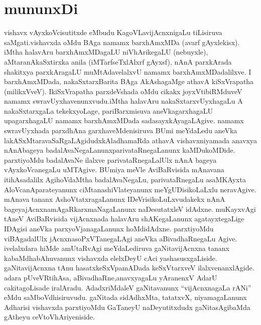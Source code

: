 {
\makeatletter
\def\@makechapterhead#1{%
  \vspace*{5\p@}%
  {\parindent \z@ \raggedright \normalfont
    \ifnum \c@secnumdepth >\m@ne
      \if@mainmatter
        \LARGE\bfseries \@chapapp\space\thechapter
        \vskip 4pt
        \par\nobreak
        \vskip 5\p@
      \fi
    \fi
    \interlinepenalty\@M
    \LARGE\bfseries #1\par\nobreak
    \vskip 15\p@
  }}
  \makeatother
  
\chapter{mununxDi}


\qquad vishavx vAyxkoVcisutitxde eMbudu KagoVLavijAcnxnigaLu tiLisiruva saMgati.\break vishavxda oMdu BAga namamx barxhAmxMDa (avarf gAyxlekisx). iMtha halavAru barxhAmxMDa\-gaLU niVhArikegaLU (nebuyxle), aMtaranAkaSxtirxka anila (iMTarfseTxlAlxrf gAyxsf), nAnA parxkArada shakitxya parxkAragaLU muMtAdavelalxvU namamx barxhAmxMDadalilxve. I barxhAmxMDada, nakaSxtarxBarita BAga AkAshagaMge athavA kiSxVrapatha (milikxVveV). I\break kiSxVrapatha parxdeVshada oMdu cikakx joyxVtibiRMduveV namamx swravUyxhavenunxvudu.\break iMtha halavAru nakaSxtarxvUyxhagaLu A nakaSxtarxgaLa tekekxyoLage, pariBarxmisuva aneVka\break garxhagaLU upagarxhagaLU namamx barxhAmxMDada sadasayxkAyagaLAgive. namamx swra\-vUyxhada parxdhAna garxhaveMdenisiruva BUmi meYdaLedu aneVka lakASxMtaravaSaRgaLAgidudx\break kAladhamaRda athavA vishavxniyamada anavxya nAnAbageya badalAvaNegaLanunx\break parivataRnegaLanunx kaMDukoMDide. parxtiyoMdu badalAvaNe ilalxve parivataRne\-gaLalUlx nAnA bageya vAyxkoVcanegaLu uMTAgive. BUmiya meVle AviBaR\-visida mAnavana itihAsadalilx AgihoVdaMtha badalAvaNegaLu, parivataRnegaLu asaMKAyxta AloVcanAparateyanunx ciMtanashiVlateyanunx meYgUDisikoLaLxlu nera\-vAgive.  mAnava tananx AshoVtatxragaLanunx IDeVrisikoLuLxvudakekx nAnA bageya\break jAcnxnamAgaRkarxmaNagaLanunx naDesutatxleV idAdxne. muKayxvAgi tAneV AviBaRvisida vijAcnxnada halavAru shAKegaLanunx agatayxtegaLige IDAgisi aneVka parxyoVjanagaLanunx hoMdidAdxne.  parxtiyoMdu viBAgadalUlx jAcnxnasoPxVTanegaLAgi aneVka aBivadhaR\-negaLu Agive. ivelalxdara hiMde amUtaRvAgi meYdaLediruva gaNitavijAcnxna tananx kabaMdhabAhuvanunx vishavxda elelxDeyU cAci yashasusxgaLiside. gaNitavijAcnxna tAnu hasatxkeSxVpamADada keSxVtarxveV ilalxvenanxlAgide. adara pUveVRtihAsa, aBivadhaRne,\break anavxyagaLu  yAranenxV AdarU cakitagoLisade iralAradu. AdadxriMdaleV gaNita\-vanunx  ``vijAcnxnagaLa rANi'' eMdu saMboVdhisiruvudu. gaNitada sidAdhxMta, tatatxvX, niyamagaLanunx Adharisi vishavxda parxtiyoMdu GaTaneyU naDeyutitxdudx gaNita\break sAgibaMda gAtheyu ceVtoVhAriyeniside.

}
